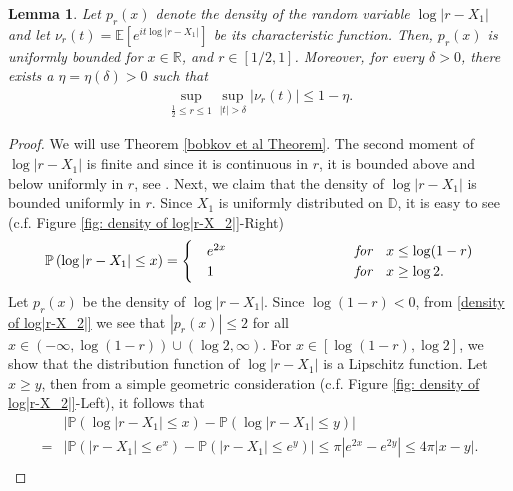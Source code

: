 \documentclass[9pt,a4paper,reqno]{amsart}
\theoremstyle{mine}
\newtheorem{Lemma}[thm]{Lemma}
\theoremstyle{definition}
\theoremstyle{remark}
\newcommand{\mb}{\mathbb}
\begin{document}
\begin{Lemma}\label{estimates for the characteristic fuction using bobkov et al} Let $p_r(x)$ denote the density of the random variable $\log|r-X_1|$ and let $\nu_r(t) = \mb{E}[e^{it\log|r-X_1|}]$ be its characteristic function. Then, $p_r(x)$ is uniformly bounded for $x\in \mb{R}$, and $r\in [1/2, 1]$. Moreover, for every $\delta>0$, there exists a $\eta = \eta (\delta) > 0$ such that
    \begin{align}
        \sup_{\frac{1}{2}\leq r \leq 1} \sup_{|t|> \delta} |\nu_r(t)| \leq  1-\eta.
    \end{align}
\end{Lemma}
\begin{proof}
We will use Theorem \ref{bobkov et al Theorem}. The second moment of $\log|r-X_1|$ is finite and since it is continuous in $r$, it is bounded above and below uniformly in $r$, see \cite[lemma 2.3]{Ghosh-numberofcomponents}. Next, we claim that the density of $\log|r-X_1|$ is bounded uniformly in $r$. Since $X_1$ is uniformly distributed on $\mb{D}$, it is easy to see (c.f. Figure \ref{fig: density of log|r-X_2|}-Right) 
    \begin{align}\label{density of log|r-X_2|}
        \mb{P}\left(\log|r-X_1| \leq x  \right) = \begin{cases}
                                                    & e^{2x} \hspace{1in}  \quad  \quad  \textit{for} \quad  x \leq \log(1-r)\\
                                                    & 1 \quad \hspace{1.12in} \quad  \textit{for} \quad x \geq \log2 .\quad  \quad 
                                                  \end{cases}
    \end{align}
    Let $p_r(x)$ be the density of $\log|r-X_1|$. Since $\log(1-r)<0$, from \eqref{density of log|r-X_2|} we see that $|p_r(x)| \leq2$ for all $x \in (-\infty, \log(1-r)) \cup (\log2, \infty)$. For $x \in [ \log(1-r),\log2] $, we show that the distribution function of $\log|r-X_1|$ is a Lipschitz function. Let $x \geq y$, then from a simple geometric consideration (c.f. Figure \ref{fig: density of log|r-X_2|}-Left), it follows that
    \begin{align*}
         &|\mb{P}\left(\log|r-X_1| \leq x  \right)-\mb{P}\left(\log|r-X_1| \leq y  \right)| \\
         =&|\mb{P}\left(|r-X_1| \leq e^x  \right)-\mb{P}\left(|r-X_1| \leq e^y  \right)|\leq \pi |e^{2x}-e^{2y}| \leq 4\pi |x-y|.\\

\end{align*}
\end{proof}
\end{document}
